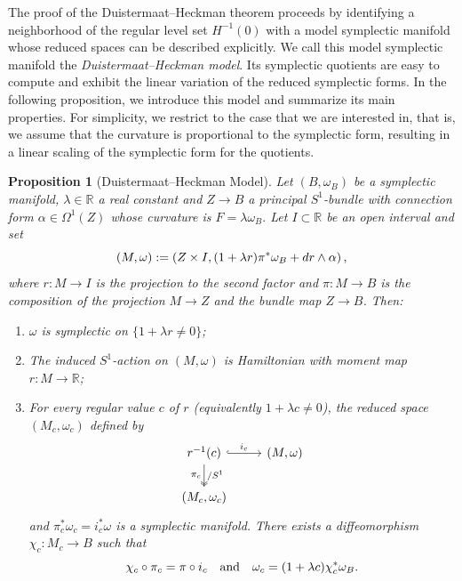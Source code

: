 \documentclass[10pt,a4paper]{amsart}
\newtheorem{proposition}[theorem]{Proposition}
\renewcommand{\dd}{\textup{d}}
\newcommand{\IR}{\mathbb{R}}
\newcommand{\R}{\mathbb{R}}
\begin{document}
The proof of the Duistermaat--Heckman theorem proceeds by identifying a neighborhood of the regular level set $H^{-1}(0)$ with a model symplectic manifold whose reduced spaces can be described explicitly. We call this model symplectic manifold the \emph{Duistermaat--Heckman model}.
Its symplectic quotients are easy to compute and exhibit the linear variation of the reduced symplectic forms. In the following proposition, we introduce this model and summarize its main properties. For simplicity, we restrict to the case that we are interested in, that is, we assume that the curvature is proportional to the symplectic form, resulting in a linear scaling of the symplectic form for the quotients.

\begin{proposition}[Duistermaat--Heckman Model]
\label{prop:DHmodel}
Let $(B,\omega_B)$ be a symplectic manifold, $\lambda\in \IR$ a real constant and $Z\to B$ a principal $S^1$-bundle with connection form $\alpha\in \Omega^1(Z)$ whose curvature is $F=\lambda\omega_B.$
Let $I\subset\R$ be an open interval and set $$(M,\omega):=\left(Z\times I,(1+\lambda r)\pi^*\omega_B+\dd r\wedge\alpha\right),$$ where $r:M\to I$ is the projection to the second factor and $\pi:M\to B$ is the composition of the projection $M\to Z$ and the bundle map $Z\to B$. Then:
\begin{enumerate}
\item $\omega$ is symplectic on $\{1+\lambda r\neq0\}$;
\item The induced $S^1$-action on $(M,\omega)$ is Hamiltonian with moment map
$r:M\to \IR$;
\item For every regular value $c$ of $r$ (equivalently $1+\lambda c\neq 0$), the reduced space $(M_c,\omega_c)$ defined by
\begin{equation*}
    \begin{tikzcd}
        r^{-1}(c) \arrow[r,hook,"i_c"] \arrow[d,two heads,"\pi_c"',"/S^1"] & (M,\omega) \\
        (M_c,\omega_c)
    \end{tikzcd}
\end{equation*}
and $\pi_c^*\omega_c = i_c^*\omega$ is a symplectic manifold. There exists a
diffeomorphism $\chi_c:M_c \longrightarrow B$ such that
\begin{equation*}
    \chi_c \circ \pi_c = \pi \circ i_c \qq{and} \omega_c = (1+\lambda c) \chi_c^*\omega_B
.
\end{equation*}
\end{enumerate}
\end{proposition}
\end{document}
